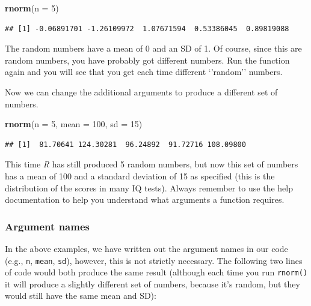 \documentclass[
]{scrartcl}
\newenvironment{Shaded}{\begin{snugshade}}{\end{snugshade}}
\newcommand{\AttributeTok}[1]{\textcolor[rgb]{0.13,0.29,0.53}{#1}}
\newcommand{\DecValTok}[1]{\textcolor[rgb]{0.00,0.00,0.81}{#1}}
\newcommand{\FunctionTok}[1]{\textcolor[rgb]{0.13,0.29,0.53}{\textbf{#1}}}
\newcommand{\NormalTok}[1]{#1}
\begin{document}
\begin{Shaded}
\begin{Highlighting}[]
\FunctionTok{rnorm}\NormalTok{(}\AttributeTok{n =} \DecValTok{5}\NormalTok{)}
\end{Highlighting}
\end{Shaded}

\begin{verbatim}
## [1] -0.06891701 -1.26109972  1.07671594  0.53386045  0.89819088
\end{verbatim}

The random numbers have a mean of 0 and an SD of 1. Of course, since this are random numbers, you have probably got different numbers. Run the function again and you will see that you get each time different `'random'' numbers.

Now we can change the additional arguments to produce a different set of numbers.

\begin{Shaded}
\begin{Highlighting}[]
\FunctionTok{rnorm}\NormalTok{(}\AttributeTok{n =} \DecValTok{5}\NormalTok{, }\AttributeTok{mean =} \DecValTok{100}\NormalTok{, }\AttributeTok{sd =} \DecValTok{15}\NormalTok{)}
\end{Highlighting}
\end{Shaded}

\begin{verbatim}
## [1]  81.70641 124.30281  96.24892  91.72716 108.09800
\end{verbatim}

This time \emph{R} has still produced 5 random numbers, but now this set of numbers has a mean of 100 and a standard deviation of 15 as specified (this is the distribution of the scores in many IQ tests). Always remember to use the help documentation to help you understand what arguments a function requires.

\subsubsection{Argument names}\label{argument-names}

In the above examples, we have written out the argument names in our code (e.g., \texttt{n}, \texttt{mean}, \texttt{sd}), however, this is not strictly necessary. The following two lines of code would both produce the same result (although each time you run \texttt{rnorm()} it will produce a slightly different set of numbers, because it's random, but they would still have the same mean and SD):
\end{document}

